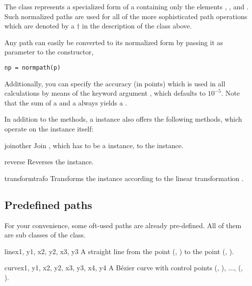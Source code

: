 The  class represents a specialized form of a
 containing only the elements ,
,  and . Such normalized
paths are used for all of the more sophisticated path operations
which are denoted by a $\dagger$ in the description of the 
class above.

Any path can easily be converted to its normalized form by passing it
as parameter to the  constructor,
\begin{verbatim}
np = normpath(p)
\end{verbatim}
Additionally, you can specify the accuracy (in points) which is used
in all  calculations by means of the keyword argument
, which defaults to $10^{-5}$.  Note that the sum of a
 and a  always yields a .

In addition to the  methods, a  instance
also offers the following methods, which operate on the instance itself:

\begin{methoddesc}{join}{other}
  Join , which has to be a  instance, to
  the  instance.
\end{methoddesc}

\begin{methoddesc}{reverse}{}
  Reverses the  instance.
\end{methoddesc}

\begin{methoddesc}{transform}{trafo}
  Transforms the  instance according to the linear
  transformation .
\end{methoddesc}

\subsection{Predefined paths}

For your convenience, some oft-used paths are already pre-defined. All
of them are sub classes of the  class.

\begin{classdesc}{line}{x1, y1, x2, y2, x3, y3}
A straight line from the point (, ) to the point (, ).
\end{classdesc}

\begin{classdesc}{curve}{x1, y1, x2, y2, x3, y3, x4, y4}
A B\'ezier curve with 
control points  (, ), $\dots$, (, ).\
\end{classdesc}


